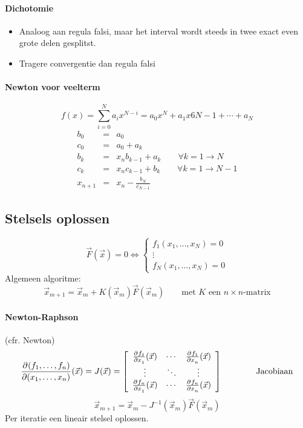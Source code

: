 \paragraph{Dichotomie}
\begin{itemize}
  \item[\warn] Analoog aan regula falsi, maar het interval wordt steeds in twee exact even grote delen gesplitst.
  \item[\con] Tragere convergentie dan regula falsi
\end{itemize}

\paragraph{Newton voor veelterm}
\[
 f(x) = \sum_{i = 0}^N a_i x^{N-i} = a_0x^N + a_1x6 {N-1} + \cdots + a_N
\]
\begin{eqnarray*}
  b_0     & = & a_0\\
  c_0     & = & a_0 + a_k \\
  b_k     & = & x_n b_{k-1} + a_k\qquad \forall k = 1 \to N\\
  c_k     & = & x_n c_{k-1} + b_k\qquad \forall k = 1 \to N-1\\
  x_{n+1} & = & x_n - \frac{b_N}{c_{N-1}}
\end{eqnarray*}


\subsection{Stelsels oplossen}
\label{sec:NAStelsels}
\[
  \vec{F}(\vec{x}) = 0
  \Leftrightarrow
  \left\{
  \begin{array}{l}
    f_1(x_1, \ldots, x_N) = 0 \\
    \vdots \\
    f_N(x_1, \ldots, x_N) = 0
  \end{array}
  \right.
\]
Algemeen algoritme:
\[
  \vec{x}_{m+1} = \vec{x}_{m} + K(\vec{x}_m)\vec{F}(\vec{x}_m) \qquad \mbox{met $K$ een $n\times n$-matrix}
\]
\paragraph{Newton-Raphson} (cfr. Newton)
\[
  \frac{\partial ^{}{(f_1, \ldots, f_n)}}{\partial (x_1, \ldots, x_n)^{}}(\vec{x}) =
  J(\vec{x}) =
  \left[
  \begin{array}{ccc}
    \frac{\partial ^{}{f_1}}{\partial x_1^{}} (\vec{x}) & \cdots & \frac{\partial ^{}{f_1}}{\partial x_n^{}}(\vec{x})\\
    \vdots & \ddots & \vdots\\
    \frac{\partial ^{}{f_n}}{\partial x_1^{}} (\vec{x})& \cdots & \frac{\partial ^{}{f_n}}{\partial x_n^{}} (\vec{x})\\
  \end{array}
  \right]
  \qquad \qquad
  \mbox{Jacobiaan}
\]
\[
 \vec{x}_{m+1} = \vec{x}_m - J^{-1}(\vec{x}_m) \vec{F}(\vec{x}_m)
\]
Per iteratie een lineair stelsel oplossen.


